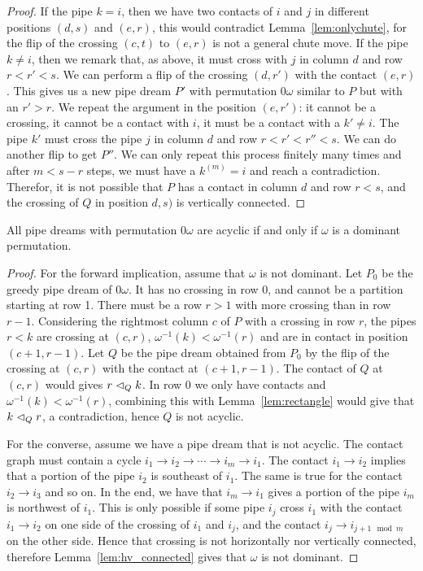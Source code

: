 \begin{proof}
If the pipe $k=i$, then we have two contacts of $i$ and $j$ in different positions $(d,s)$ and $(e,r)$, this would contradict Lemma~\ref{lem:onlychute}, for the flip of the crossing $(c,t)$
to $(e,r)$ is not a general chute move. If the pipe $k\ne i$, then we remark that, as above, it must cross with $j$ in column $d$ and row $r<r'<s$. We can perform a flip of the crossing
$(d,r')$ with the contact $(e,r)$. This gives us a new pipe dream $P'$ with permutation $0\omega$ similar to $P$ but with an $r'>r$. We repeat the argument in the position $(e,r')$: it cannot be a crossing,
it cannot be a contact with $i$, it must be a contact with a $k'\ne i$. The pipe $k'$ must cross the pipe $j$ in column $d$ and row $r<r'<r''<s$. We can do another flip to get $P''$.
We can only repeat this process finitely many times and after $m<s-r$ steps, we must have a $k^{(m)}=i$ and reach a contradiction. 
Therefor, it is not possible that $P$ has a contact in column $d$ and row $r<s$, and the crossing of $Q$ in position $d,s)$ is vertically connected.
\end{proof}

\begin{theorem}%
\label{prob:nuAcyclicProperty}
All pipe dreams with permutation $0 \omega$ are acyclic if and only if $\omega$ is a dominant permutation.
\end{theorem}

\begin{proof} For the forward implication, assume that $\omega$ is not dominant. 
Let $P_0$ be the greedy pipe dream of $0\omega$. It has no crossing in row 0, and cannot be a partition starting at row 1.
There must be a row $r>1$ with more crossing than in row $r-1$. 
Considering the rightmost column $c$ of $P$ with a crossing in row $r$,  the pipes $r<k$ are crossing at $(c,r)$, $\omega^{-1}(k)<\omega^{-1}(r)$ and are in contact in position $(c+1,r-1)$.
Let $Q$ be the pipe dream obtained from $P_0$ by the flip of the crossing at $(c,r)$ with the contact at $(c+1,r-1)$.
The contact of $Q$ at $(c,r)$ would gives $r\vartriangleleft_{Q} k$. In row $0$ we only have contacts and $\omega^{-1}(k)<\omega^{-1}(r)$, combining this  with Lemma~\ref{lem:rectangle} would give  that 
$k \vartriangleleft_{Q} r$, a contradiction, hence $Q$ is not acyclic.

For the converse, assume we have a pipe dream that is not acyclic. The contact graph must contain a cycle $i_1 \to i_2\to\cdots\to i_m\to i_1$.
The contact $i_1 \to i_2$ implies that a portion of the pipe $i_2$ is southeast of $i_1$. The same is true for the contact $i_2\to i_3$ and so on.
In the end, we have that $i_m\to i_1$ gives a portion of the pipe $i_m$ is northwest of $i_1$. 
This is only possible if some pipe $i_j$ cross $i_1$ with the contact $i_1\to i_2$ on one side of the crossing of $i_1$ and $i_j$, and the contact $i_j \to i_{j+1 \mod m}$ on the other side.
Hence that crossing is not horizontally nor vertically connected, therefore Lemma~\ref{lem:hv_connected} gives that $\omega$ is not dominant.
\end{proof}

